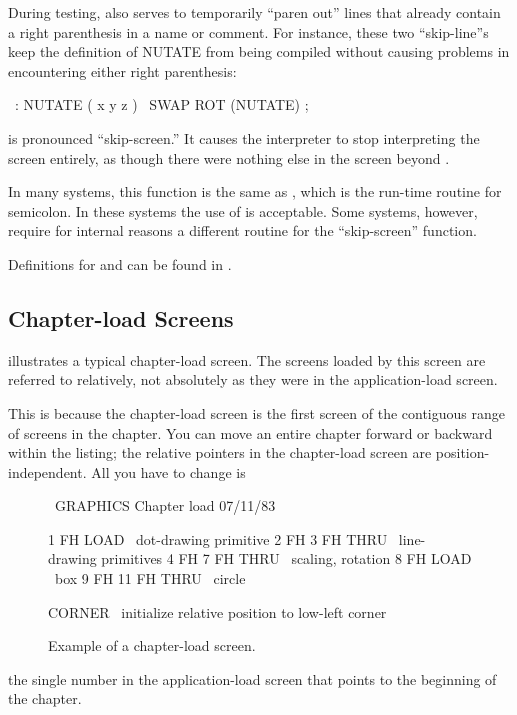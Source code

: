 During testing, \forth{\bs} also serves to temporarily ``paren
out'' lines that already contain a right parenthesis in a name or
comment.  For instance, these two ``skip-line''s keep the definition
of NUTATE from being compiled without causing problems in encountering
either right parenthesis:
\begin{Code}
\ : NUTATE ( x y z )
\   SWAP ROT  (NUTATE) ;
\end{Code}
 is pronounced ``skip-screen.'' It causes the
\Forth{} interpreter to stop interpreting the screen entirely, as
though there were nothing else in the screen beyond .

In many \Forth{} systems, this function is the same as , which
is the run-time routine for semicolon.  In these systems the use of  is
acceptable.  Some \Forth{} systems, however, require for internal reasons
a different routine for the ``skip-screen'' function.

Definitions for \forth{\bs} and  can be found in .

\subsection{Chapter-load Screens}

 illustrates a typical chapter-load screen.  The screens loaded by
this screen are referred to relatively, not absolutely as they were in the
application-load screen.

This is because the chapter-load screen is the first screen of the contiguous
range of screens in the chapter.  You can move an entire chapter
forward or backward within the listing; the relative pointers in the
chapter-load screen are position-independent.  All you have to change is
\begin{figure*}
\caption{Example of a chapter-load screen.}

\setcounter{screen}{100}
\begin{Screen}
\ GRAPHICS                 Chapter load                 07/11/83

 1 FH LOAD            \ dot-drawing primitive
 2 FH 3 FH THRU       \ line-drawing primitives
 4 FH 7 FH THRU       \ scaling, rotation
 8 FH LOAD            \ box
 9 FH 11 FH THRU      \ circle



CORNER  \ initialize relative position to low-left corner





\end{Screen}
\end{figure*}
the single number in the application-load screen that points to the beginning
of the chapter.

